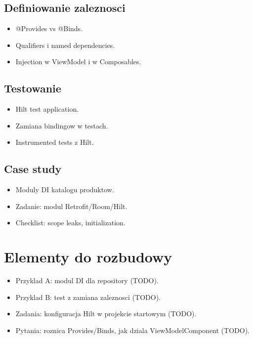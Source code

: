 \subsection{Definiowanie zaleznosci}
\begin{itemize}
  \item @Provides vs @Binds.
  \item Qualifiers i named dependencies.
  \item Injection w ViewModel i w Composables.
\end{itemize}

\subsection{Testowanie}
\begin{itemize}
  \item Hilt test application.
  \item Zamiana bindingow w testach.
  \item Instrumented tests z Hilt.
\end{itemize}

\subsection{Case study}
\begin{itemize}
  \item Moduly DI katalogu produktow.
  \item Zadanie: modul Retrofit/Room/Hilt.
  \item Checklist: scope leaks, initialization.
\end{itemize}

\section{Elementy do rozbudowy}
\begin{itemize}
  \item Przyklad A: modul DI dla repository (TODO).
  \item Przyklad B: test z zamiana zaleznosci (TODO).
  \item Zadania: konfiguracja Hilt w projekcie startowym (TODO).
  \item Pytania: roznica Provides/Binds, jak dziala ViewModelComponent (TODO).
\end{itemize}

